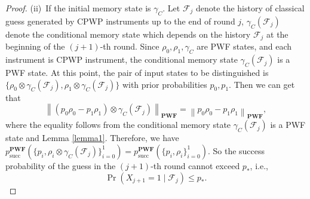 \documentclass[aps,pra,twocolumn,floatfix,amsfonts,10pt]{revtex4-2}
\begin{document}
\begin{proof}
	(ii)~If the initial memory state is $\gamma_C$. 
	Let $\mathcal{F}_j$ denote the history of classical guess generated by CPWP instruments up to the end of round $j$, $\gamma_C(\mathcal{F}_j)$ denote the conditional memory state which depends on the history $\mathcal{F}_j$ at the beginning of the $(j+1)$-th round.
	Since $\rho_0, \rho_1, \gamma_C$ are PWF states, and each instrument is CPWP instrument, the conditional memory state $\gamma_C(\mathcal{F}_j)$ is a PWF state. 
	At this point, the pair of input states to be distinguished is $\{\rho_0\otimes\gamma_C(\mathcal{F}_j), \rho_1\otimes\gamma_C(\mathcal{F}_j)\}$ with prior probabilities $p_0,p_1$.
	Then we can get that
	\begin{equation}
		\left\|\left(p_0\rho_0-p_1\rho_1\right)\otimes \gamma_C(\mathcal{F}_j) \right\|_{\mathbf{PWF}} = \left\|p_0\rho_0-p_1\rho_1\right\|_{\mathbf{PWF}},
	\end{equation}
	where the equality follows from the conditional memory state $\gamma_C(\mathcal{F}_j)$ is a PWF state and Lemma \ref{lemma1}.
	Therefore, we have $p_{\mathrm{succ}}^{\mathbf{PWF}}\left(\{p_i,\rho_i \otimes \gamma_C(\mathcal{F}_j) \}_{i=0}^{1}\right) = p_{\mathrm{succ}}^{\mathbf{PWF}}\left(\{p_i,\rho_i\}_{i=0}^{1}\right)$.
	So the success probability of the guess in the $(j+1)$-th round cannot exceed $p_*$, i.e.,
	\begin{equation}\label{conditional success bound}
		\Pr(X_{j+1}=1\mid \mathcal{F}_j) \leqslant p_*.
	\end{equation}
	

\end{proof}
\end{document}
